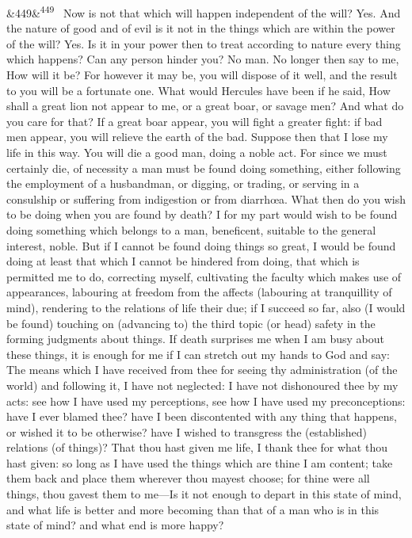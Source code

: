 \documentclass[12pt]{article}
\newcommand{\para}[1][]{\par\noindent\ifx&#1&\else\textsuperscript{\footnotesize #1}~\fi}
\begin{document}
\para[449] Now is not that which will happen independent of the will? Yes. And the nature of good and of evil is it not in the things which are within the power of the will? Yes. Is it in your power then to treat according to nature every thing which happens? Can any person hinder you? No man. No longer then say to me, How will it be? For however it may be, you will dispose of it well, and the result to you will be a fortunate one. What would Hercules have been if he said, How shall a great lion not appear to me, or a great boar, or savage men? And what do you care for that? If a great boar appear, you will fight a greater fight: if bad men appear, you will relieve the earth of the bad. Suppose then that I lose my life in this way. You will die a good man, doing a noble act. For since we must certainly die, of necessity a man must be found doing something, either following the employment of a husbandman, or digging, or trading, or serving in a consulship or suffering from indigestion or from diarrhœa. What then do you wish to be doing when you are found by death? I for my part would wish to be found doing something which belongs to a man, beneficent, suitable to the general interest, noble. But if I cannot be found doing things so great, I would be found doing at least that which I cannot be hindered from doing, that which is permitted me to do, correcting myself, cultivating the faculty which makes use of appearances, labouring at freedom from the affects (labouring at tranquillity of mind), rendering to the relations of life their due; if I succeed so far, also (I would be found) touching on (advancing to) the third topic (or head) safety in the forming judgments about things. If death surprises me when I am busy about these things, it is enough for me if I can stretch out my hands to God and say: The means which I have received from thee for seeing thy administration (of the world) and following it, I have not neglected: I have not dishonoured thee by my acts: see how I have used my perceptions, see how I have used my preconceptions: have I ever blamed thee? have I been discontented with any thing that happens, or wished it to be otherwise? have I wished to transgress the (established) relations (of things)? That thou hast given me life, I thank thee for what thou hast given: so long as I have used the things which are thine I am content; take them back and place them wherever thou mayest choose; for thine were all things, thou gavest them to me—Is it not enough to depart in this state of mind, and what life is better and more becoming than that of a man who is in this state of mind? and what end is more happy?
\end{document}
